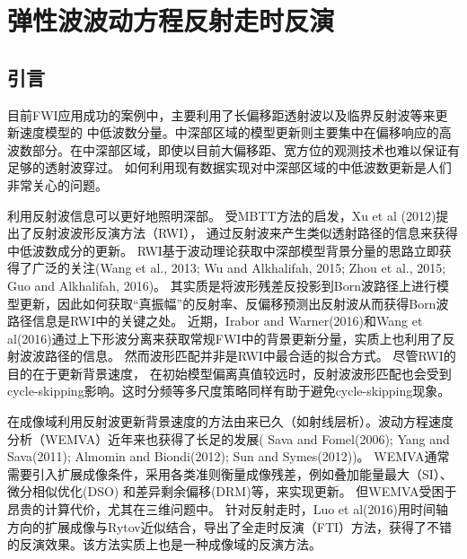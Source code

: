 \chapter{弹性波波动方程反射走时反演}

\section{引言}
目前FWI应用成功的案例中，主要利用了长偏移距透射波以及临界反射波等来更新速度模型的
中低波数分量。中深部区域的模型更新则主要集中在偏移响应的高波数部分。在中深部区域，即使以目前大偏移距、宽方位的观测技术也难以保证有足够的透射波穿过。
如何利用现有数据实现对中深部区域的中低波数更新是人们非常关心的问题。

利用反射波信息可以更好地照明深部。
受MBTT方法的启发，Xu et al
(2012)\cite{xu:2012}提出了反射波波形反演方法（RWI），
通过反射波来产生类似透射路径的信息来获得中低波数成分的更新。
RWI基于波动理论获取中深部模型背景分量的思路立即获得了广泛的关注(Wang et al., 2013\cite{Wang2013}; Wu and Alkhalifah, 2015; 
Zhou et al., 2015\cite{zhou:2015}; Guo and Alkhalifah, 2016\cite{Guo2016})。
其实质是将波形残差反投影到Born波路径上进行模型更新，因此如何获取“真振幅”的反射率、反偏移预测出反射波从而获得Born波路径信息是RWI中的关键之处。
近期，Irabor and
Warner(2016)\cite{Irabor2016}和Wang et
al(2016)\cite{WangFangEtAl2016}通过上下形波分离来获取常规FWI中的背景更新分量，实质上也利用了反射波波路径的信息。
然而波形匹配并非是RWI中最合适的拟合方式。
尽管RWI的目的在于更新背景速度，
在初始模型偏离真值较远时，反射波波形匹配也会受到cycle-skipping影响。这时分频等多尺度策略同样有助于避免cycle-skipping现象\cite{Wang2013}。

在成像域利用反射波更新背景速度的方法由来已久（如射线层析）。波动方程速度分析（WEMVA）近年来也获得了长足的发展(
Sava and
Fomel(2006)\cite{SavaEtAl2006}; Yang and Sava(2011)\cite{YangEtAl2011}; Almomin and
Biondi(2012)\cite{Almomin2012}; Sun and Symes(2012)\cite{SunEtAl2012})。
WEMVA通常需要引入扩展成像条件，采用各类准则衡量成像残差，例如叠加能量最大（SI）\cite{ChaventEtAl1995}、微分相似优化(DSO)\cite{SymesEtAl1991}
和差异剩余偏移(DRM)\cite{SavaEtAl2004}等，来实现更新。
但WEMVA受困于昂贵的计算代价，尤其在三维问题中。
针对反射走时，Luo et
al(2016)\cite{Luo2016}用时间轴方向的扩展成像与Rytov近似结合，导出了全走时反演（FTI）方法，获得了不错的反演效果。该方法实质上也是一种成像域的反演方法。

